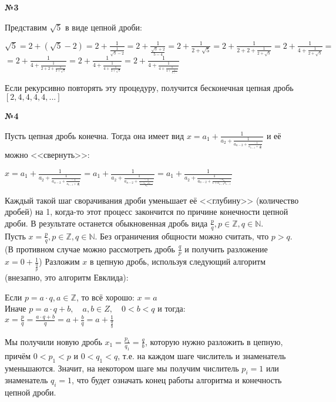 \documentclass{article}
\newenvironment{task}{\begin{center}\fontsize{14}{14}\selectfont\bf}{\rm\fontsize{12}{12}\selectfont\end{center}}
\newcommand{\Z}{\mathbb{Z}}
\newcommand{\N}{\mathbb{N}}
\begin{document}
	\begin{task} 
		№3
	\end{task}
	Представим $\sqrt{5}$ в виде цепной дроби: 
	\begin{center}
		\fontsize{14}{14}\selectfont
		$\sqrt{5} = 2 + (\sqrt{5} - 2) = 2 + \frac{1}{\frac{1}{\sqrt{5} - 2}} = 2 + \frac{1}{\frac{\sqrt{5} + 2}{5 - 4}}
		= 2 + \frac{1}{2 + \sqrt{5}} 
		= 2 + \frac{1}{2 + 2 + \frac{1}{2 + \sqrt{5}}} 
		= 2 + \frac{1}{4 + \frac{1}{2 + \sqrt{5}}} = $ \\ $ 
		= 2 + \frac{1}{4 + \frac{1}{2 + 2 + \frac{1}{2 + \sqrt{5}} }} 
		= 2 + \frac{1}{4 + \frac{1}{4 + \frac{1}{2 + \sqrt{5}} }} 
		= 2 + \frac{1}{4 + \frac{1}{4 + \frac{1}{4 + \frac{1}{4 + \dots}}}} $ \\
		\fontsize{12}{12}\selectfont
	\end{center}
	Если рекурсивно повторять эту процедуру, получится бесконечная цепная дробь $[2, 4, 4, 4, 4, ...]$

	
	\begin{task} 
		№4
	\end{task}
	Пусть цепная дробь конечна. Тогда она имеет вид $x = a_1 + \frac{1}{a_2 + \frac{1}{
			a_{n-2} + \frac{\ddots 1}{a_{n-1} + \frac{1}{a_n}}}}$ и её можно <<свернуть>>: \\
		
	\begin{center}
		\fontsize{14}{14}\selectfont
		$x = a_1 + \frac{1}{a_2 + \frac{1}{
				a_{n-2} + \frac{\ddots 1}{a_{n-1} + \frac{1}{a_n}}}} 
		= a_1 + \frac{1}{a_2 + \frac{1}{a_{n-2} + \frac{\ddots 1}{\frac{1 + a_{n-2}a_{n-1}}{a_n}}}}
		= a_1 + \frac{1}{a_2 + \frac{1}{a_{n-2} + \frac{\ddots a_n}{1 + a_{n-2}a_{n-1}}}} $
		
		\fontsize{12}{12}\selectfont
	\end{center}
	Каждый такой шаг сворачивания дроби уменьшает её <<глубину>> (количество дробей) на 1, когда-то этот процесс закончится по причине конечности цепной дроби. В результате останется обыкновенная дробь вида $\frac{p}{q}, p \in \Z, q \in \N$. \\
	
	Пусть $x = \frac{p}{q}, p \in \Z, q \in \N$. Без ограничения общности можно считать, что $p > q$. (В противном случае можно рассмотреть дробь $\frac{q}{p}$ и получить разложение $x = 0 + \frac{1}{\frac{q}{p}}$) Разложим $x$ в цепную дробь, используя следующий алгоритм (внезапно, это алгоритм Евклида):
	\begin{center}
		Если $p = a\cdot q, a\in\Z$, то всё хорошо: $x = a$ \\
		Иначе $p = a\cdot q + b, \quad a, b \in Z, \quad 0 < b < q$ и тогда: \\
		\fontsize{14}{14}\selectfont
		$x = \frac{p}{q} = \frac{a\cdot q + b}{q} = a + \frac{b}{q} = a + \frac{1}{\frac{q}{b}}$
		
		\fontsize{12}{12}\selectfont
	\end{center}
	Мы получили новую дробь $x_1 = \frac{p_1}{q_1} = \frac{q}{b}$, которую нужно разложить в цепную, причём $0 < p_1 < p$ и $0 < q_1 < q$, т.е. на каждом шаге числитель и знаменатель уменьшаются. Значит, на некотором шаге мы получим числитель $p_i = 1$ или знаменатель $q_i = 1$, что будет означать конец работы алгоритма и конечность цепной дроби.
	
\end{document}
